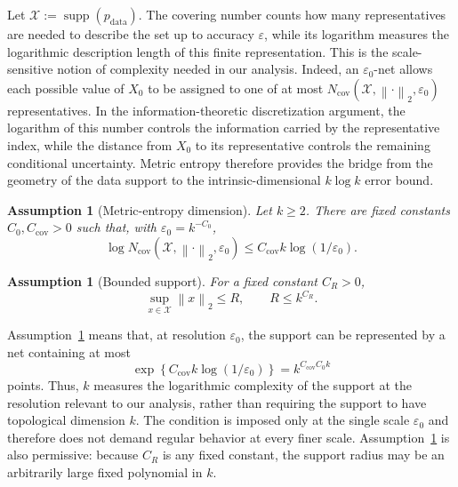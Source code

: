 \documentclass[11pt]{article}
\newtheorem{assumption}[theorem]{Assumption}
\theoremstyle{definition}
\newcommand{\pdata}{p_{\mathrm{data}}}
\newcommand{\norm}[1]{\left\lVert #1\right\rVert_2}
\newcommand{\supp}{\operatorname{supp}}
\begin{document}
Let $\mathcal X:=\supp(\pdata)$.
The covering number counts how many representatives are needed to
describe the set up to accuracy $\varepsilon$, while its logarithm
measures the logarithmic description length of this finite
representation. This is the scale-sensitive notion of complexity
needed in our analysis. Indeed, an $\varepsilon_0$-net allows each
possible value of $X_0$ to be assigned to one of at most
$N_{\mathrm{cov}}(\mathcal X,\norm{\cdot},\varepsilon_0)$
representatives. In the information-theoretic discretization argument,
the logarithm of this number controls the information carried by the
representative index, while the distance from $X_0$ to its
representative controls the remaining conditional uncertainty. Metric
entropy therefore provides the bridge from the geometry of the data
support to the intrinsic-dimensional $k\log k$ error bound.

\begin{assumption}[Metric-entropy dimension]
\label{ass:entropy}
Let $k\ge2$. There are fixed constants $C_0,C_{\mathrm{cov}}>0$ such that, with
$\varepsilon_0=k^{-C_0}$,
\begin{equation}
    \log N_{\mathrm{cov}}(\mathcal X,\norm{\cdot},\varepsilon_0)
    \le C_{\mathrm{cov}}k\log(1/\varepsilon_0).
    \label{eq:entropy-assumption}
\end{equation}
\end{assumption}

\begin{assumption}[Bounded support]
\label{ass:support}
For a fixed constant $C_R>0$,
\begin{equation}
    \sup_{x\in\mathcal X}\norm{x}\le R,
    \qquad R\le k^{C_R}.
    \label{eq:support-bound}
\end{equation}
\end{assumption}

Assumption~\ref{ass:entropy} means that, at resolution
$\varepsilon_0$, the support can be represented by a net containing
at most
\[
    \exp\left\{
        C_{\mathrm{cov}}k\log(1/\varepsilon_0)
    \right\}
    =k^{C_{\mathrm{cov}}C_0k}
\]
points. Thus, $k$ measures the logarithmic complexity of the support
at the resolution relevant to our analysis, rather than requiring the
support to have topological dimension $k$. The condition is imposed
only at the single scale $\varepsilon_0$ and therefore does not demand
regular behavior at every finer scale. Assumption~\ref{ass:support}
is also permissive: because $C_R$ is any fixed constant, the support
radius may be an arbitrarily large fixed polynomial in $k$.
\end{document}

